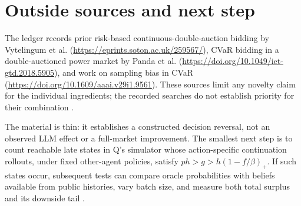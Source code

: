 \documentclass{article}
\begin{document}
\section{Outside sources and next step}

The ledger records prior risk-based continuous-double-auction bidding by Vytelingum et al. (\url{https://eprints.soton.ac.uk/259567/}), CVaR bidding in a double-auctioned power market by Panda et al. (\url{https://doi.org/10.1049/iet-gtd.2018.5905}), and work on sampling bias in CVaR (\url{https://doi.org/10.1609/aaai.v29i1.9561}). These sources limit any novelty claim for the individual ingredients; the recorded searches do not establish priority for their combination .

The material is thin: it establishes a constructed decision reversal, not an observed LLM effect or a full-market improvement. The smallest next step is to count reachable late states in Q's simulator whose action-specific continuation rollouts, under fixed other-agent policies, satisfy \(ph>g>h(1-f/\beta)_+\). If such states occur, subsequent tests can compare oracle probabilities with beliefs available from public histories, vary batch size, and measure both total surplus and its downside tail .
\end{document}
